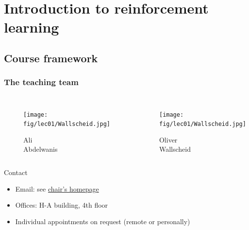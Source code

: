 \section{Introduction to reinforcement learning} 

\subsection{Course framework} 

\begin{frame}
	\frametitle{The teaching team}
	\vspace{-0.5cm}
	\begin{columns}[t]
	
		\begin{figure}
			\centering
				\texttt{[image: fig/lec01/Wallscheid.jpg]}
				\caption*{Ali \\Abdelwanis}
		\end{figure}
			
		\begin{figure}
			\centering
				\texttt{[image: fig/lec01/Wallscheid.jpg]}
				\caption*{Oliver\\ Wallscheid}
		\end{figure}
		
	\end{columns}
	\vspace{-0.25cm}
	\begin{varblock}{Contact}
		\begin{itemize}
			\item Email: see \href{https://www.eti.uni-siegen.de/ias/}{chair's homepage}
			\item Offices: H-A building, 4th floor
			\item Individual appointments on request (remote or personally)
		\end{itemize}
	\end{varblock}
	\end{frame}

